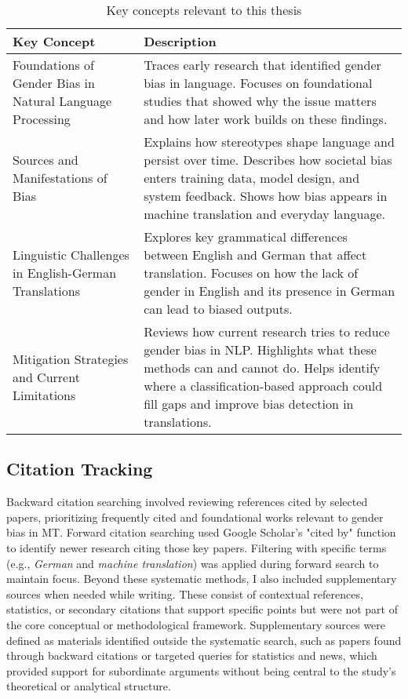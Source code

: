 \renewcommand{\arraystretch}{1.3}
\begin{table}[ht!]
\centering
\begin{tabularx}{\textwidth}{>{\raggedright\arraybackslash}p{6.5cm}X}
\toprule
\textbf{Key Concept} & \textbf{Description} \\
\midrule

Foundations of Gender Bias in Natural Language Processing & Traces early research that identified gender bias in language. Focuses on foundational studies that showed why the issue matters and how later work builds on these findings. \\

Sources and Manifestations of Bias & Explains how stereotypes shape language and persist over time. Describes how societal bias enters training data, model design, and system feedback. Shows how bias appears in machine translation and everyday language. \\

Linguistic Challenges in English-German Translations & Explores key grammatical differences between English and German that affect translation. Focuses on how the lack of gender in English and its presence in German can lead to biased outputs. \\

Mitigation Strategies and Current Limitations & Reviews how current research tries to reduce gender bias in NLP. Highlights what these methods can and cannot do. Helps identify where a classification-based approach could fill gaps and improve bias detection in translations. \\

\bottomrule
\end{tabularx}
\caption{Key concepts relevant to this thesis}
\label{tab:key-concepts}
\end{table}


\subsection{Citation Tracking}
Backward citation searching involved reviewing references cited by selected papers, prioritizing frequently cited and foundational works relevant to gender bias in MT. Forward citation searching used Google Scholar's "cited by" function to identify newer research citing those key papers. Filtering with specific terms (e.g., \textit{German} and \textit{machine translation}) was applied during forward search to maintain focus. Beyond these systematic methods, I also included supplementary sources when needed while writing. These consist of contextual references, statistics, or secondary citations that support specific points but were not part of the core conceptual or methodological framework. Supplementary sources were defined as materials identified outside the systematic search, such as papers found through backward citations or targeted queries for statistics and news, which provided support for subordinate arguments without being central to the study's theoretical or analytical structure.



